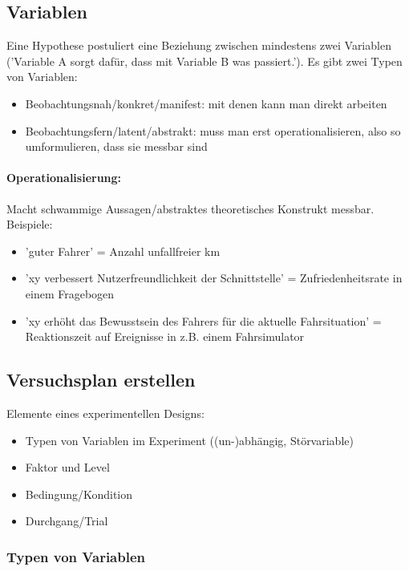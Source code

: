 		\subsection{Variablen}
			Eine Hypothese postuliert eine Beziehung zwischen mindestens zwei Variablen ('Variable A sorgt dafür, dass mit Variable B was passiert.'). Es gibt zwei Typen von Variablen:
			\begin{itemize}
				\item Beobachtungsnah/konkret/manifest: mit denen kann man direkt arbeiten
				\item Beobachtungsfern/latent/abstrakt: muss man erst operationalisieren, also so umformulieren, dass sie messbar sind
			\end{itemize}
			
			\paragraph{Operationalisierung:} Macht schwammige Aussagen/abstraktes theoretisches Konstrukt messbar. Beispiele:
				\begin{itemize}
					\item 'guter Fahrer' = Anzahl unfallfreier km
					\item 'xy verbessert Nutzerfreundlichkeit der Schnittstelle' = Zufriedenheitsrate in einem Fragebogen
					
					\item 'xy erhöht das Bewusstsein des Fahrers für die aktuelle Fahrsituation' = Reaktionszeit auf Ereignisse in z.B. einem Fahrsimulator \\
				\end{itemize}
			
			
		\subsection{Versuchsplan erstellen}
			Elemente eines experimentellen Designs:
			\begin{itemize}
				\item Typen von Variablen im Experiment ((un-)abhängig, Störvariable)
				\item Faktor und Level
				\item Bedingung/Kondition
				\item Durchgang/Trial
			\end{itemize}
		
			\subsubsection{Typen von Variablen}
